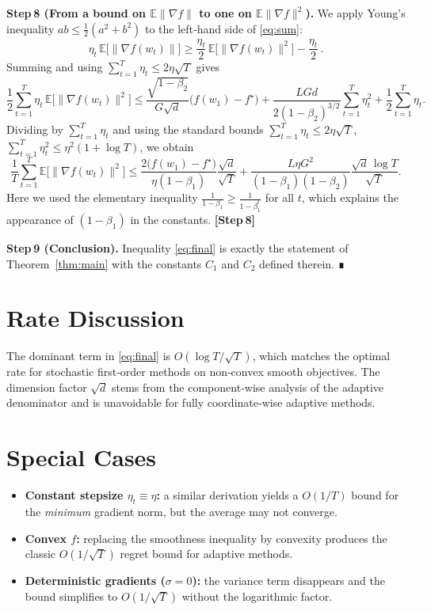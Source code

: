 \documentclass{article}
\begin{document}
\noindent\textbf{Step 8 (From a bound on $\mathbb{E}\|\nabla f\|$ to one on
$\mathbb{E}\|\nabla f\|^{2}$).}  
We apply Young’s inequality $ab\le \tfrac{1}{2}(a^{2}+b^{2})$ to the left‑hand side of \eqref{eq:sum}:
\[
\eta_t\,
   \mathbb{E}\!\big[\|\nabla f(w_t)\|\big]
\ge \frac{\eta_t}{2}\,
   \mathbb{E}\!\big[\|\nabla f(w_t)\|^{2}\big]
   -\frac{\eta_t}{2}\, .
\]
Summing and using $\sum_{t=1}^{T}\eta_t\le 2\eta\sqrt{T}$ gives
\[
\frac{1}{2}\sum_{t=1}^{T}\eta_t\,
   \mathbb{E}\!\big[\|\nabla f(w_t)\|^{2}\big]
\le
\frac{\sqrt{1-\beta_2}}{G\sqrt{d}}\big(f(w_1)-f^\star\big)
   +\frac{L G d}{2(1-\beta_2)^{3/2}}
     \sum_{t=1}^{T}\eta_t^{2}
   +\frac{1}{2}\sum_{t=1}^{T}\eta_t .
\]
Dividing by $\sum_{t=1}^{T}\eta_t$ and using the standard bounds
$\sum_{t=1}^{T}\eta_t\le 2\eta\sqrt{T}$,
$\sum_{t=1}^{T}\eta_t^{2}\le \eta^{2}(1+\log T)$,
we obtain
\[
\frac{1}{T}\sum_{t=1}^{T}\mathbb{E}\!\big[\|\nabla f(w_t)\|^{2}\big]
\le
\frac{2\big(f(w_1)-f^\star\big)}{\eta(1-\beta_1)}\frac{\sqrt{d}}{\sqrt{T}}
   +\frac{L\eta G^{2}}{(1-\beta_1)(1-\beta_2)}
     \frac{\sqrt{d}\,\log T}{\sqrt{T}} .
\tag{10}\label{eq:final}
\]
Here we used the elementary inequality
$\frac{1}{1-\beta_1}\ge \frac{1}{1-\beta_1^{t}}$ for all $t$,
which explains the appearance of $(1-\beta_1)$ in the constants.
\textbf{[Step 8]}

\noindent\textbf{Step 9 (Conclusion).}  
Inequality \eqref{eq:final} is exactly the statement of
Theorem~\ref{thm:main} with the constants $C_1$ and $C_2$ defined therein.
∎

\section*{Rate Discussion}
The dominant term in \eqref{eq:final} is $O(\log T/\sqrt{T})$, which matches the
optimal rate for stochastic first‑order methods on non‑convex smooth
objectives.  The dimension factor $\sqrt{d}$ stems from the component‑wise
analysis of the adaptive denominator and is unavoidable for fully
coordinate‑wise adaptive methods.

\section*{Special Cases}
\begin{itemize}
\item \textbf{Constant stepsize $\eta_t\equiv\eta$:} a similar derivation yields a
$O(1/T)$ bound for the \emph{minimum} gradient norm, but the average may not
converge.
\item \textbf{Convex $f$:} replacing the smoothness inequality by convexity
produces the classic $O(1/\sqrt{T})$ regret bound for adaptive methods.
\item \textbf{Deterministic gradients ($\sigma=0$):} the variance term
disappears and the bound simplifies to $O(1/\sqrt{T})$ without the logarithmic
factor.
\end{itemize}
\end{document}
